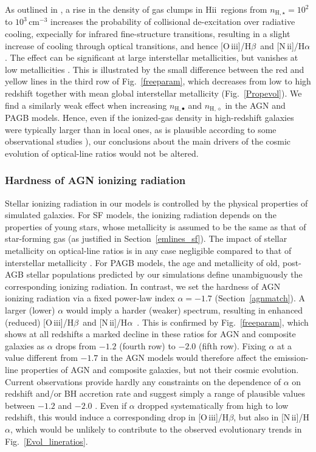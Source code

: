 \documentclass[fleqn,usenatbib]{mnras}
\newcommand{\hii}{\hbox{H{\sc ii}}}
\newcommand{\oiiihb}{\hbox{[O\,{\sc iii}]/H$\beta$}}
\newcommand{\niiha}{\hbox{[N\,{\sc ii}]/H$\alpha$}}
\begin{document}
As outlined in \citet[][see their section~3.3]{Gutkin16}, a rise in
the density of gas clumps in \hii\ regions from $n_{\mathrm{H},
  \star}=10^2$ to $10^3\,\mathrm{cm}^{-3}$ increases the probability
of collisional de-excitation over radiative cooling, expecially for
infrared fine-structure transitions, resulting in a slight increase of
cooling through optical transitions, and hence \oiiihb\ and
\niiha. The effect can be significant at large interstellar
metallicities, but vanishes at low metallicities \citep[fig.~5
of][]{Gutkin16}. This is illustrated by the small difference between
the red and yellow lines in the third row of Fig.~\ref{freeparam},
which decreases from low to  high redshift together with mean global
interstellar metallicity (Fig.~\ref{Propevol}).  We find a similarly
weak effect when increasing $n_{\mathrm{H}, \bullet}$ and
$n_{\mathrm{H}, \diamond}$ in the AGN and PAGB models. Hence,  even if
the ionized-gas density in high-redshift galaxies were typically
larger  than in local ones, as is plausible according to some
observational  studies \citealp[e.g.,][]{Steidel14,Sanders16,
  Kashino17}), our conclusions  about the main drivers of the cosmic
evolution of optical-line ratios would  not be altered.   

\subsubsection{Hardness of AGN ionizing radiation}

Stellar ionizing radiation in our models is controlled by the physical 
properties  of simulated galaxies. For SF models, the ionizing
radiation depends on the properties of young stars, whose metallicity
is assumed to be the same as that of star-forming gas (as justified in
Section~\ref{emlines_sf}). The impact of  stellar metallicity on
optical-line ratios is in any case negligible compared to that of
interstellar metallicity \citep[e.g.][]{Gutkin16}. For PAGB models,
the age  and metallicity of old, post-AGB stellar populations
predicted by our simulations define unambiguously the corresponding
ionizing radiation. In contrast, we set the hardness of AGN ionizing
radiation via a fixed power-law index $\alpha=-1.7$
(Section~\ref{agnmatch}). A larger (lower) $\alpha$ would imply a
harder (weaker)  spectrum, resulting in enhanced (reduced) \oiiihb\
and \niiha\  \citep{Feltre16}. This  is confirmed by
Fig.~\ref{freeparam}, which shows at all redshifts a marked decline in
these ratios for AGN and composite galaxies as $\alpha$ drops from
$-1.2$ (fourth row)  to $-2.0$ (fifth row). Fixing $\alpha$ at a value
different from $-1.7$ in the AGN models  would therefore affect the
emission-line properties of AGN and composite galaxies, but  not their
cosmic evolution.  Current observations provide hardly any constraints 
on the dependence of $\alpha$ on redshift and/or BH accretion rate and suggest 
simply a range of plausible values between $-1.2$ and $-2.0$ 
\citep[e.g.,][]{Feltre16}. Even if $\alpha$ dropped systematically from
high to low redshift, this would induce a corresponding drop in
\oiiihb, but also in \niiha, which would be unlikely to  contribute to
the observed evolutionary trends in Fig.~\ref{Evol_lineratios}.
\end{document}
